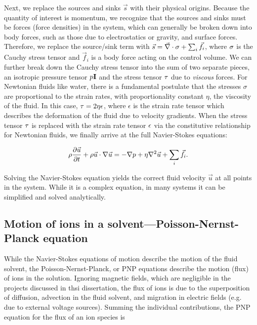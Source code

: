 			Next, we replace the sources and sinks $\vec{s}$ with their physical origins. Because the quantity of interest is momentum, we recognize that the sources and sinks must be forces (force densities) in the system, which can generally be broken down into body forces, such as those due to electrostatics or gravity, and surface forces. Therefore, we replace the source/sink term with $\vec{s}=\vec{\nabla}\cdot\mathbf{\sigma}+\sum_{i}\vec{f}_{i}$, where $\mathbf{\sigma}$ is the Cauchy stress tensor and $\vec{f}_{i}$ is a body force acting on the control volume. We can further break down the Cauchy stress tensor into the sum of two separate pieces, an isotropic pressure tensor $p\mathbf{I}$ and the stress tensor $\mathbf{\tau}$ due to \textit{viscous} forces. For Newtonian fluids like water, there is a fundamental postulate that the stresses $\sigma$ are proportional to the strain rates, with proportionality constant $\eta$, the viscosity of the fluid. In this case, $\mathbf{\tau}=2\eta\mathbf{\epsilon}$, where $\epsilon$ is the strain rate tensor which describes the deformation of the fluid due to velocity gradients. When the stress tensor $\mathbf{\tau}$ is replaced with the strain rate tensor $\mathbf{\epsilon}$ via the constitutive relationship for Newtonian fluids, we finally arrive at the full Navier-Stokes equations:
			
			\begin{equation} \label{eq:ns}
				\rho\frac{\partial \vec{u}}{\partial t}+\rho\vec{u}\cdot\mathbf{\nabla}\vec{u}=-\mathbf{\nabla}p+\eta\mathbf{\nabla}^{2}\vec{u}+\sum_{i}\vec{f}_{i}.
			\end{equation}
			
			Solving the Navier-Stokes equation yields the correct fluid velocity $\vec{u}$ at all points in the system. While it is a complex equation, in many systems it can be simplified and solved analytically.
			
		\subsection{Motion of ions in a solvent---Poisson-Nernst-Planck equation}
		
			While the Navier-Stokes equations of motion describe the motion of the fluid solvent, the Poisson-Nernst-Planck, or PNP equations describe the motion (flux) of ions in the solution. Ignoring magnetic fields, which are negligible in the projects discussed in thsi dissertation, the flux of ions is due to the superposition of diffusion, advection in the fluid solvent, and migration in electric fields (e.g.~ due to external voltage sources). Summing the individual contributions, the PNP equation for the flux of an ion species is
			

